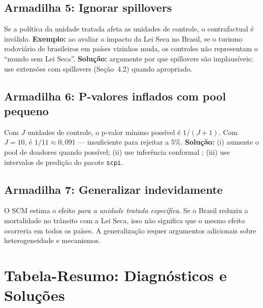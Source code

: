 \documentclass[12pt, a4paper, openany]{book}
\begin{document}
\subsection{Armadilha 5: Ignorar spillovers}

Se a política da unidade tratada afeta as unidades de controle, o contrafactual é inválido. \textbf{Exemplo:} ao avaliar o impacto da Lei Seca no Brasil, se o turismo rodoviário de brasileiros em países vizinhos muda, os controles não representam o ``mundo sem Lei Seca''. \textbf{Solução:} argumente por que spillovers são implausíveis; use extensões com spillovers (Seção~4.2) quando apropriado.

\subsection{Armadilha 6: P-valores inflados com pool pequeno}

Com $J$ unidades de controle, o p-valor mínimo possível é $1/(J+1)$. Com $J = 10$, é $1/11 \approx 0{,}091$ --- insuficiente para rejeitar a 5\%. \textbf{Solução:} (i) aumente o pool de doadores quando possível; (ii) use inferência conformal \citep{ChernozhukovEtAl2021}; (iii) use intervalos de predição do pacote \texttt{scpi}.

\subsection{Armadilha 7: Generalizar indevidamente}

O SCM estima o efeito \textit{para a unidade tratada específica}. Se o Brasil reduziu a mortalidade no trânsito com a Lei Seca, isso não significa que o mesmo efeito ocorreria em todos os países. A generalização requer argumentos adicionais sobre heterogeneidade e mecanismos.

\section{Tabela-Resumo: Diagnósticos e Soluções}
\end{document}
